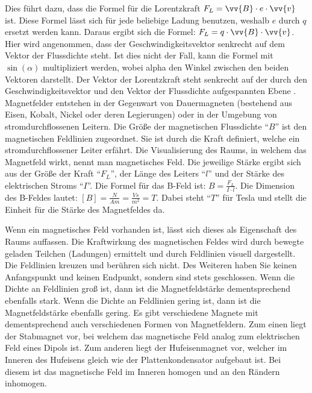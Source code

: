 Dies führt dazu, dass die Formel für die Lorentzkraft $F_L =\vv{B} \cdot e \cdot \vv{v}$ ist.
Diese Formel lässt sich für jede beliebige Ladung benutzen, weshalb $e$ durch $q$ ersetzt werden kann.
Daraus ergibt sich die Formel: $F_L = q \cdot \vv{B} \cdot \vv{v}$.
Hier wird angenommen, dass der Geschwindigkeitsvektor senkrecht auf dem Vektor der Flussdichte steht.
Ist dies nicht der Fall, kann die Formel mit $\sin(\alpha)$ multipliziert werden, wobei alpha den Winkel zwischen den beiden Vektoren darstellt.
Der Vektor der Lorentzkraft steht senkrecht auf der durch den Geschwindigkeitsvektor und den Vektor der Flussdichte aufgespannten Ebene \cite{Lorentzkraft}.
Magnetfelder entstehen in der Gegenwart von Dauermagneten (bestehend aus Eisen, Kobalt, Nickel oder deren Legierungen) oder in der Umgebung von stromdurchflossenen Leitern. 
Die Größe der magnetischen Flussdichte "`$B$"' ist den magnetischen Feldlinien zugeordnet.
Sie ist durch die Kraft definiert, welche ein stromdurchflossener Leiter erfährt.
Die Visualisierung des Raums, in welchem das Magnetfeld wirkt, nennt man magnetisches Feld.
Die jeweilige Stärke ergibt sich aus der Größe der Kraft "`$F_L$"', der Länge des Leiters "`$l$"' und der Stärke des elektrischen Stroms "`$I$"'.
Die Formel für das B-Feld ist: $B = \frac{F_L}{I \cdot l}$.
Die Dimension des B-Feldes lautet: $[B] = \frac{N}{Am} = \frac{Vs}{m^2} = T$.
Dabei steht "`$T$"' für Tesla und stellt die Einheit für die Stärke des Magnetfeldes da.

Wenn ein magnetisches Feld vorhanden ist, lässt sich dieses als Eigenschaft des Raums auffassen.
Die Kraftwirkung des magnetischen Feldes wird durch bewegte geladen Teilchen (Ladungen) ermittelt und durch Feldlinien visuell dargestellt.
Die Feldlinien kreuzen und berühren sich nicht.
Des Weiteren haben Sie keinen Anfangspunkt und keinen Endpunkt, sondern sind stets geschlossen.
Wenn die Dichte an Feldlinien groß ist, dann ist die Magnetfeldstärke dementsprechend ebenfalls stark.
Wenn die Dichte an Feldlinien gering ist, dann ist die Magnetfeldstärke ebenfalls gering.
Es gibt verschiedene Magnete mit dementsprechend auch verschiedenen Formen von Magnetfeldern. 
Zum einen liegt der Stabmagnet vor, bei welchem das magnetische Feld analog zum elektrischen Feld eines Dipols ist.
Zum anderen liegt der Hufeisenmagnet vor, welcher im Inneren des Hufeisens gleich wie der Plattenkondensator aufgebaut ist.
Bei diesem ist das magnetische Feld im Inneren homogen und an den Rändern inhomogen. 
